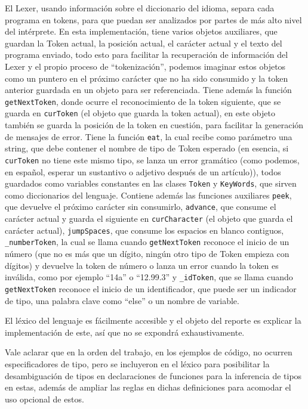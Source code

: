 \documentclass{article}
\begin{document}
El Lexer, usando información sobre el diccionario del idioma, separa cada programa en tokens, para que puedan ser analizados por partes de más alto nivel del intérprete. En esta implementación, tiene varios objetos auxiliares, que guardan la Token actual, la posición actual, el carácter actual y el texto del programa enviado, todo esto para facilitar la recuperación de información del Lexer y el propio proceso de “tokenización”, podemos imaginar estos objetos como un puntero en el próximo carácter que no ha sido consumido y la token anterior guardada en un objeto para ser referenciada. Tiene además la función \texttt{getNextToken}, donde ocurre el reconocimiento de la token siguiente, que se guarda en \texttt{curToken} (el objeto que guarda la token actual), en este objeto también se guarda la posición de la token en cuestión, para facilitar la generación de mensajes de error. Tiene la función \texttt{eat}, la cual recibe como parámetro una string, que debe contener el nombre de tipo de Token esperado (en esencia, si \texttt{curToken} no tiene este mismo tipo, se lanza un error gramático (como podemos, en español, esperar un sustantivo o adjetivo después de un artículo)), todos guardados como variables constantes en las clases \texttt{Token} y \texttt{KeyWords}, que sirven como diccionarios del lenguaje. Contiene además las funciones auxiliares \texttt{peek}, que devuelve el próximo carácter sin consumirlo, \texttt{advance}, que consume el carácter actual y guarda el siguiente en \texttt{curCharacter} (el objeto que guarda el carácter actual), \texttt{jumpSpaces}, que consume los espacios en blanco contiguos, \texttt{\_numberToken}, la cual se llama cuando \texttt{getNextToken} reconoce el inicio de un número (que no es más que un dígito, ningún otro tipo de Token empieza con dígitos) y devuelve la token de número o lanza un error cuando la token es inválida, como por ejemplo “14a” o “12.99.3” y \texttt{\_idToken}, que se llama cuando \texttt{getNextToken} reconoce el inicio de un identificador, que puede ser un indicador de tipo, una palabra clave como “else” o un nombre de variable.

El léxico del lenguaje es fácilmente accesible y el objeto del reporte es explicar la implementación de este, así que no se expondrá exhaustivamente.

Vale aclarar que en la orden del trabajo, en los ejemplos de código, no ocurren especificadores de tipo, pero se incluyeron en el léxico para posibilitar la desambiguación de tipos en declaraciones de funciones para la inferencia de tipos en estas, además de ampliar las reglas en dichas definiciones para acomodar el uso opcional de estos.
\end{document}
